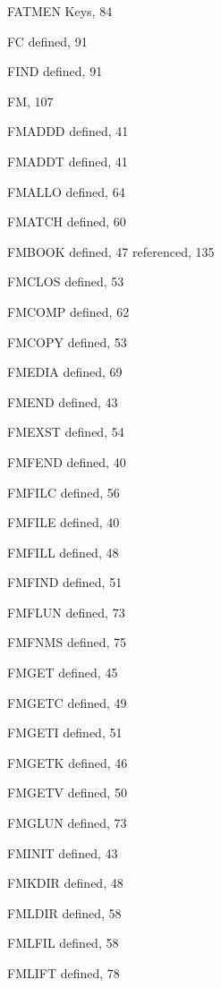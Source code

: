 \begin{theindex}
  \item FATMEN Keys, 84
  \item FC
    \subitem defined, 91
  \item FIND
    \subitem defined, 91
  \item FM, 107
  \item FMADDD
    \subitem defined, 41
  \item FMADDT
    \subitem defined, 41
  \item FMALLO
    \subitem defined, 64
  \item FMATCH
    \subitem defined, 60
  \item FMBOOK
    \subitem defined, 47
    \subitem referenced, 135
  \item FMCLOS
    \subitem defined, 53
  \item FMCOMP
    \subitem defined, 62
  \item FMCOPY
    \subitem defined, 53
  \item FMEDIA
    \subitem defined, 69
  \item FMEND
    \subitem defined, 43
  \item FMEXST
    \subitem defined, 54
  \item FMFEND
    \subitem defined, 40
  \item FMFILC
    \subitem defined, 56
  \item FMFILE
    \subitem defined, 40
  \item FMFILL
    \subitem defined, 48
  \item FMFIND
    \subitem defined, 51
  \item FMFLUN
    \subitem defined, 73
  \item FMFNMS
    \subitem defined, 75
  \item FMGET
    \subitem defined, 45
  \item FMGETC
    \subitem defined, 49
  \item FMGETI
    \subitem defined, 51
  \item FMGETK
    \subitem defined, 46
  \item FMGETV
    \subitem defined, 50
  \item FMGLUN
    \subitem defined, 73
  \item FMINIT
    \subitem defined, 43
  \item FMKDIR
    \subitem defined, 48
  \item FMLDIR
    \subitem defined, 58
  \item FMLFIL
    \subitem defined, 58
  \item FMLIFT
    \subitem defined, 78

\end{theindex}
